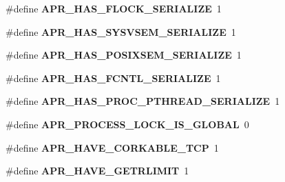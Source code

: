 \begin{DoxyCompactItemize}
\item 
\hypertarget{group__apr__platform_ga3cdde1dc287da276eb56d7c5ed351713}{\#define {\bfseries A\-P\-R\-\_\-\-H\-A\-S\-\_\-\-F\-L\-O\-C\-K\-\_\-\-S\-E\-R\-I\-A\-L\-I\-Z\-E}~1}\label{group__apr__platform_ga3cdde1dc287da276eb56d7c5ed351713}

\item 
\hypertarget{group__apr__platform_ga3b4f7591d97f21818b51b793752fa5fe}{\#define {\bfseries A\-P\-R\-\_\-\-H\-A\-S\-\_\-\-S\-Y\-S\-V\-S\-E\-M\-\_\-\-S\-E\-R\-I\-A\-L\-I\-Z\-E}~1}\label{group__apr__platform_ga3b4f7591d97f21818b51b793752fa5fe}

\item 
\hypertarget{group__apr__platform_ga100a44703cbec87774ad3ba78ce4372a}{\#define {\bfseries A\-P\-R\-\_\-\-H\-A\-S\-\_\-\-P\-O\-S\-I\-X\-S\-E\-M\-\_\-\-S\-E\-R\-I\-A\-L\-I\-Z\-E}~1}\label{group__apr__platform_ga100a44703cbec87774ad3ba78ce4372a}

\item 
\hypertarget{group__apr__platform_ga372220e70e4da519ebcaaf8476525227}{\#define {\bfseries A\-P\-R\-\_\-\-H\-A\-S\-\_\-\-F\-C\-N\-T\-L\-\_\-\-S\-E\-R\-I\-A\-L\-I\-Z\-E}~1}\label{group__apr__platform_ga372220e70e4da519ebcaaf8476525227}

\item 
\hypertarget{group__apr__platform_gabc09d4599769b9cef0e972b0050c9e11}{\#define {\bfseries A\-P\-R\-\_\-\-H\-A\-S\-\_\-\-P\-R\-O\-C\-\_\-\-P\-T\-H\-R\-E\-A\-D\-\_\-\-S\-E\-R\-I\-A\-L\-I\-Z\-E}~1}\label{group__apr__platform_gabc09d4599769b9cef0e972b0050c9e11}

\item 
\hypertarget{group__apr__platform_ga2faf50198d02b5f6e21c32429ca1c5b4}{\#define {\bfseries A\-P\-R\-\_\-\-P\-R\-O\-C\-E\-S\-S\-\_\-\-L\-O\-C\-K\-\_\-\-I\-S\-\_\-\-G\-L\-O\-B\-A\-L}~0}\label{group__apr__platform_ga2faf50198d02b5f6e21c32429ca1c5b4}

\item 
\hypertarget{group__apr__platform_gab841a4b1a92684a089fbab9e7bce737a}{\#define {\bfseries A\-P\-R\-\_\-\-H\-A\-V\-E\-\_\-\-C\-O\-R\-K\-A\-B\-L\-E\-\_\-\-T\-C\-P}~1}\label{group__apr__platform_gab841a4b1a92684a089fbab9e7bce737a}

\item 
\hypertarget{group__apr__platform_ga58025dd20776cbc5a5e7a18f1ac6d5ad}{\#define {\bfseries A\-P\-R\-\_\-\-H\-A\-V\-E\-\_\-\-G\-E\-T\-R\-L\-I\-M\-I\-T}~1}\label{group__apr__platform_ga58025dd20776cbc5a5e7a18f1ac6d5ad}


\end{DoxyCompactItemize}
